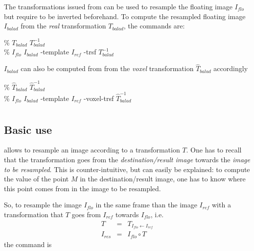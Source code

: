 The transformations issued from \baladin can be used to resample the floating image $I_{flo}$ but require to be inverted beforehand. To compute the resampled floating image $I_{balad}$ from the \textit{real} transformation $T_{balad}$, the commands are:
\begin{code}{0.8}
\% \invTrsf $T_{balad}$ $T^{-1}_{balad}$ \\
\% \applyTrsf $I_{flo}$ $I_{balad}$ -template $I_{ref}$ -trsf $T^{-1}_{balad}$
\end{code}
$I_{balad}$ can also be computed from from the \textit{voxel} transformation $\hat{T}_{balad}$ accordingly
\begin{code}{0.8}
\% \invTrsf $\hat{T}_{balad}$ $\hat{T}^{-1}_{balad}$ \\
\% \applyTrsf $I_{flo}$ $I_{balad}$ -template $I_{ref}$ -voxel-trsf $\hat{T}^{-1}_{balad}$
\end{code}










%
%
%










\section{\applyTrsf}
\label{sec:applyTrsf}

\subsection{Basic use}

\applyTrsf allows to resample an image according to a transformation $T$. One has to recall that the transformation goes from the \textit{destination/result image} towards the \textit{image to be resampled}. This is counter-intuitive, but can easily be explained: to compute the value of the point $M$ in the destination/result image, one has to know where this point comes from in the image to be resampled.

So, to resample the image $I_{flo}$ in the same frame than the image $I_{ref}$ with a transformation that $T$ goes from $I_{ref}$ towards $I_{flo}$, i.e. 
\begin{eqnarray*}
T & = & T_{I_{flo} \leftarrow I_{ref}} \\
I_{res} & = & I_{flo} \circ T
\end{eqnarray*}
 the command is  

